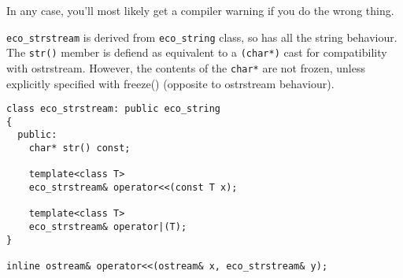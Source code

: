 In any case, you'll most likely get a compiler warning if you do the
wrong thing.

{\tt eco\_strstream} is derived from {\tt eco\_string} class, so has
all the string behaviour. The \verb+str()+ member is defiend as
equivalent to a \verb+(char*)+ cast for compatibility with ostrstream.
However, the contents of the \verb+char*+ are not frozen, unless
explicitly specified with freeze() (opposite to ostrstream behaviour).

\begin{verbatim}
class eco_strstream: public eco_string
{
  public:
    char* str() const;
    
    template<class T>
    eco_strstream& operator<<(const T x); 

    template<class T>
    eco_strstream& operator|(T);
}

inline ostream& operator<<(ostream& x, eco_strstream& y);
\end{verbatim}

